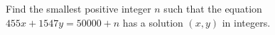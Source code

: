 Find the smallest positive integer $n$ such that the equation $455x+1547y=50000+n$ has a solution $(x,y)$ in integers.
